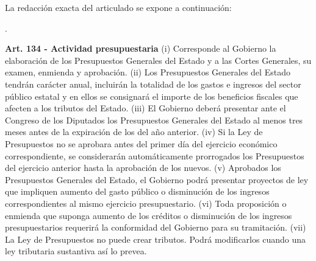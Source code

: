 \documentclass[10pt,a4paper]{article}
\newcounter{numitem}
\newenvironment{lnum}
      {\begin{list}{\arabic{numitem}.}{%
          \usecounter{numitem}%
          \setlength{\leftmargin}{1cm}%
          \setlength{\parskip}{3pt}%
          \setlength{\itemsep}{0pt}%
          \setlength{\parsep}{0pt}%
      }}
      {\end{list}}
\begin{document}
La redacción exacta del articulado se expone a continuación:
\begin{lnum}
    \item \textbf{Art. 134 - Actividad presupuestaria} (i) Corresponde al Gobierno la elaboración de los Presupuestos Generales del Estado y a las Cortes Generales, su examen, enmienda y aprobación. (ii) Los Presupuestos Generales del Estado tendrán carácter anual, incluirán la totalidad de los gastos e ingresos del sector público estatal y en ellos se consignará el importe de los beneficios fiscales que afecten a los tributos del Estado. (iii) El Gobierno deberá presentar ante el Congreso de los Diputados los Presupuestos Generales del Estado al menos tres meses antes de la expiración de los del año anterior. (iv) Si la Ley de Presupuestos no se aprobara antes del primer día del ejercicio económico correspondiente, se considerarán automáticamente prorrogados los Presupuestos del ejercicio anterior hasta la aprobación de los nuevos. (v) Aprobados los Presupuestos Generales del Estado, el Gobierno podrá presentar proyectos de ley que impliquen aumento del gasto público o disminución de los ingresos correspondientes al mismo ejercicio presupuestario. (vi) Toda proposición o enmienda que suponga aumento de los créditos o disminución de los ingresos presupuestarios requerirá la conformidad del Gobierno para su tramitación. (vii) La Ley de Presupuestos no puede crear tributos. Podrá modificarlos cuando una ley tributaria sustantiva así lo prevea.

\end{lnum}
\end{document}
